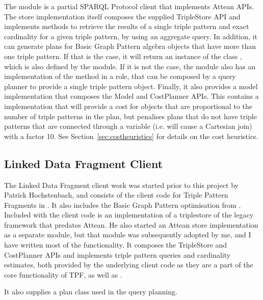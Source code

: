 \begin{subappendices}
The  module is a partial SPARQL
Protocol client that implements Attean APIs. The store implementation
itself composes the supplied \mbox{TripleStore} API and implements methods to retrieve
the results of a single triple pattern and exact cardinality for a
given triple pattern, by using an aggregate query. In addition, it can
generate plans for Basic Graph Pattern algebra objects that have more
than one triple pattern. If that is the case, it will return an
instance of the class , which is
also defined by the module. If it is not the case, the module also has
an implementation of the  method in a
 role, that can be
composed by a query planner to provide a single triple pattern
 object. Finally, it also provides a
model implementation that composes the Model and \mbox{CostPlanner}
APIs. This contains a  implementation that will
provide a cost for  objects that are
proportional to the number of triple patterns in the plan, but
penalises plans that do not have triple patterns that are connected
through a variable (i.e. will cause a Cartesian join) with a factor
10. See Section~\ref{sec:costheuristics} for details on the cost
heuristics.

\subsection{Linked Data Fragment Client}\label{sec:ldfclient}

The Linked Data Fragment client work was started prior to this project
by Patrick Hochstenbach, and consists of the client code for Triple
Pattern Fragments in . It also includes the Basic
Graph Pattern optimisation from \cite{verborgh2014querying}. Included with the client
code is an implementation of a triplestore of the legacy
 framework that predates Attean. He also started
an Attean store implementation  as a
separate module, but that module was subsequently adopted by me, and I
have written most of the functionality. It composes the \mbox{TripleStore}
and \mbox{CostPlanner} APIs and implements triple pattern queries and
cardinality estimates, both provided by the underlying client code as
they are a part of the core functionality of TPF,
as well as .

It also supplies a plan class 
used in the query planning. 


\end{subappendices}


